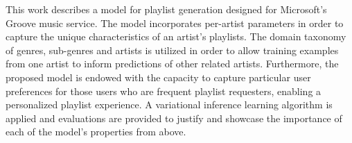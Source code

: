 This work describes a model for playlist generation designed for Microsoft's Groove music service. The model incorporates per-artist parameters in order to capture the unique characteristics of an artist's playlists. The domain taxonomy of genres, sub-genres and artists is utilized in order to allow training examples from one artist to inform predictions of other related artists. 
Furthermore, the proposed model is endowed with the capacity to capture particular user preferences for those users who are frequent playlist requesters, enabling a personalized playlist experience. %
A variational inference learning algorithm is applied and evaluations are provided to justify and showcase the importance of each of the model's properties from above. 


